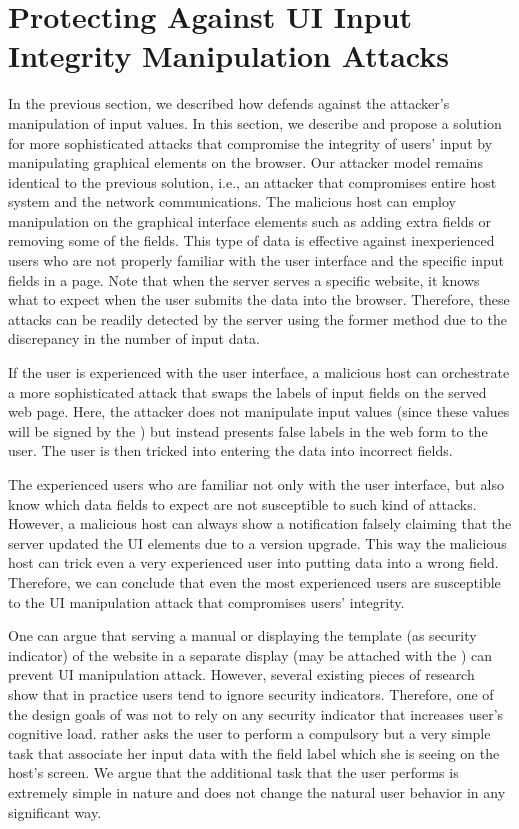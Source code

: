 \section{Protecting Against UI Input Integrity Manipulation Attacks}
\label{sec:fieldSwap}


\iffalse
In the previous section, we described how \device defends against the attacker's manipulation of input values. In this section, we describe and propose a solution for more sophisticated attacks that compromise the integrity of users' input by manipulating graphical elements on the browser. Our attacker model remains identical to the previous solution, i.e., an attacker that compromises entire host system and the network communications. The malicious host can employ manipulation on the graphical interface elements such as adding extra fields or removing some of the fields. This type of data is effective against inexperienced users who are not properly familiar with the user interface and the specific input fields in a page. Note that when the server serves a specific website, it knows what to expect when the user submits the data into the browser. Therefore, these attacks can be readily detected by the server using the former method due to the discrepancy in the number of input data.  

If the user is experienced with the user interface, a malicious host can orchestrate a more sophisticated attack that swaps the labels of input fields on the served web page. Here, the attacker does not manipulate input values (since these values will be signed by the \device) but instead presents false labels in the web form to the user. The user is then tricked into entering the data into incorrect fields.

The experienced users who are familiar not only with the user interface, but also know which data fields to expect are not susceptible to such kind of attacks. However, a malicious host can always show a notification falsely claiming that the server updated the UI elements due to a version upgrade. This way the malicious host can trick even a very experienced user into putting data into a wrong field. Therefore, we can conclude that even the most experienced users are susceptible to the UI manipulation attack that compromises users' integrity. 

One can argue that serving a manual or displaying the template (as security indicator) of the website in a separate display (may be attached with the \device) can prevent UI manipulation attack. However, several existing pieces of research~\cite{197283,41927} show that in practice users tend to ignore security indicators. Therefore, one of the design goals of \tool was not to rely on any security indicator that increases user's cognitive load. \tool rather asks the user to perform a compulsory but a very simple task that associate her input data with the field label which she is seeing on the host's screen. We argue that the additional task that the user performs is extremely simple in nature and does not change the natural user behavior in any significant way.

